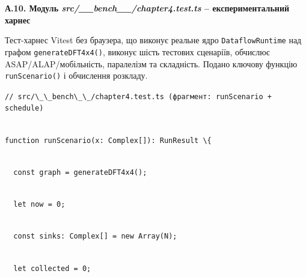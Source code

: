 \documentclass[
]{article}
\newcommand{\passthrough}[1]{#1}
\begin{document}
\textbf{А.10. Модуль \emph{src/\_\_bench\_\_/chapter4.test.ts} --
експериментальний харнес}

Тест-харнес Vitest без браузера, що виконує реальне ядро
\passthrough{\lstinline!DataflowRuntime!} над графом
\passthrough{\lstinline!generateDFT!}\passthrough{\lstinline!4!}\passthrough{\lstinline!x!}\passthrough{\lstinline!4()!},
виконує шість тестових сценаріїв, обчислює ASAP/ALAP/мобільність,
паралелізм та складність. Подано ключову функцію
\passthrough{\lstinline!runScenario!}\passthrough{\lstinline!()!} і
обчислення розкладу.

\passthrough{\lstinline!//!}\passthrough{\lstinline! !}\passthrough{\lstinline!src!}\passthrough{\lstinline!/\_\_bench\_\_/chapter4.test.ts!}\passthrough{\lstinline! !}\passthrough{\lstinline!(!}\passthrough{\lstinline!фрагмент!}\passthrough{\lstinline!:!}\passthrough{\lstinline! !}\passthrough{\lstinline!runScenario!}\passthrough{\lstinline! !}\passthrough{\lstinline!+!}\passthrough{\lstinline! !}\passthrough{\lstinline!schedule)!}\strut \\
\passthrough{\lstinline!function!}\passthrough{\lstinline! !}\passthrough{\lstinline!runScenario!}\passthrough{\lstinline!(x:!}\passthrough{\lstinline! !}\passthrough{\lstinline!Complex[]):!}\passthrough{\lstinline! !}\passthrough{\lstinline!RunResult!}\passthrough{\lstinline! !}\passthrough{\lstinline!\{!}\strut \\
\passthrough{\lstinline!  !}\passthrough{\lstinline!const!}\passthrough{\lstinline! !}\passthrough{\lstinline!graph!}\passthrough{\lstinline! !}\passthrough{\lstinline!=!}\passthrough{\lstinline! !}\passthrough{\lstinline!generateDFT4x4();!}\strut \\
\passthrough{\lstinline!  !}\passthrough{\lstinline!let!}\passthrough{\lstinline! !}\passthrough{\lstinline!now!}\passthrough{\lstinline! !}\passthrough{\lstinline!=!}\passthrough{\lstinline! !}\passthrough{\lstinline!0;!}\strut \\
\passthrough{\lstinline!  !}\passthrough{\lstinline!const!}\passthrough{\lstinline! !}\passthrough{\lstinline!sinks:!}\passthrough{\lstinline! !}\passthrough{\lstinline!Complex[]!}\passthrough{\lstinline! !}\passthrough{\lstinline!=!}\passthrough{\lstinline! !}\passthrough{\lstinline!new!}\passthrough{\lstinline! !}\passthrough{\lstinline!Array(N);!}\strut \\
\passthrough{\lstinline!  !}\passthrough{\lstinline!let!}\passthrough{\lstinline! !}\passthrough{\lstinline!collected!}\passthrough{\lstinline! !}\passthrough{\lstinline!=!}\passthrough{\lstinline! !}\passthrough{\lstinline!0;!}\strut \\
\end{document}
